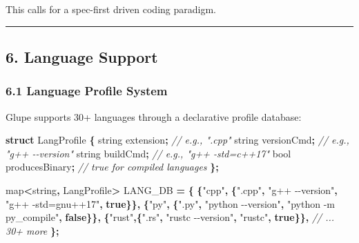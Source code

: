 \documentclass[11pt, a4paper]{article}
\newenvironment{Shaded}{\begin{snugshade}}{\end{snugshade}}
\newcommand{\CommentTok}[1]{\textcolor[rgb]{0.56,0.35,0.01}{\textit{#1}}}
\newcommand{\DataTypeTok}[1]{\textcolor[rgb]{0.13,0.29,0.53}{#1}}
\newcommand{\KeywordTok}[1]{\textcolor[rgb]{0.13,0.29,0.53}{\textbf{#1}}}
\newcommand{\NormalTok}[1]{#1}
\newcommand{\OperatorTok}[1]{\textcolor[rgb]{0.81,0.36,0.00}{\textbf{#1}}}
\newcommand{\StringTok}[1]{\textcolor[rgb]{0.31,0.60,0.02}{#1}}
\begin{document}
This calls for a spec-first driven coding paradigm.

\begin{center}\rule{0.5\linewidth}{0.5pt}\end{center}

\subsection{6. Language Support}\label{language-support}

\subsubsection{6.1 Language Profile
System}\label{language-profile-system}

Glupe supports 30+ languages through a declarative profile database:

\begin{Shaded}
\begin{Highlighting}[]
\KeywordTok{struct}\NormalTok{ LangProfile }\OperatorTok{\{}
\NormalTok{    string extension}\OperatorTok{;}        \CommentTok{// e.g., ".cpp"}
\NormalTok{    string versionCmd}\OperatorTok{;}       \CommentTok{// e.g., "g++ {-}{-}version"}
\NormalTok{    string buildCmd}\OperatorTok{;}         \CommentTok{// e.g., "g++ {-}std=c++17"}
    \DataTypeTok{bool}\NormalTok{ producesBinary}\OperatorTok{;}     \CommentTok{// true for compiled languages}
\OperatorTok{\};}

\NormalTok{map}\OperatorTok{\textless{}}\NormalTok{string}\OperatorTok{,}\NormalTok{ LangProfile}\OperatorTok{\textgreater{}}\NormalTok{ LANG\_DB }\OperatorTok{=} \OperatorTok{\{}
    \OperatorTok{\{}\StringTok{"cpp"}\OperatorTok{,} \OperatorTok{\{}\StringTok{".cpp"}\OperatorTok{,} \StringTok{"g++ {-}{-}version"}\OperatorTok{,} \StringTok{"g++ {-}std=gnu++17"}\OperatorTok{,} \KeywordTok{true}\OperatorTok{\}\},}
    \OperatorTok{\{}\StringTok{"py"}\OperatorTok{,}  \OperatorTok{\{}\StringTok{".py"}\OperatorTok{,}  \StringTok{"python {-}{-}version"}\OperatorTok{,} \StringTok{"python {-}m py\_compile"}\OperatorTok{,} \KeywordTok{false}\OperatorTok{\}\},}
    \OperatorTok{\{}\StringTok{"rust"}\OperatorTok{,\{}\StringTok{".rs"}\OperatorTok{,}  \StringTok{"rustc {-}{-}version"}\OperatorTok{,} \StringTok{"rustc"}\OperatorTok{,} \KeywordTok{true}\OperatorTok{\}\},}
    \CommentTok{// ... 30+ more}
\OperatorTok{\};}
\end{Highlighting}
\end{Shaded}
\end{document}
